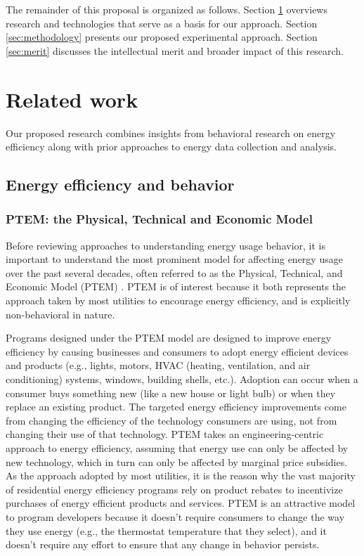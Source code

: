 The remainder of this proposal is organized as follows.  Section
\ref{sec:related-work} overviews research and technologies that serve as a
basis for our approach.  Section \ref{sec:methodology} presents our proposed
experimental approach.  Section \ref{sec:merit} discusses the intellectual
merit and broader impact of this research. 

\section{Related work}
\label{sec:related-work}

Our proposed research combines insights from behavioral research on energy
efficiency along with prior approaches to energy data collection and analysis.

\subsection{Energy efficiency and behavior}

\subsubsection{PTEM: the Physical, Technical and Economic Model}

Before reviewing approaches to understanding energy usage behavior, it is
important to understand the most prominent model for affecting energy usage over the
past several decades, often referred to as the Physical, Technical, and
Economic Model (PTEM) \cite{Lutzenhiser93}.  PTEM is of interest because it
both represents the approach taken by most utilities to encourage energy
efficiency, and is explicitly non-behavioral in nature.

Programs designed under the PTEM model are designed to improve energy
efficiency by causing businesses and consumers to adopt energy efficient
devices and products (e.g., lights, motors, HVAC (heating, ventilation, and
air conditioning) systems, windows, building shells, etc.).  Adoption can
occur when a consumer buys something new (like a new house or light bulb)
or when they replace an existing product.  The targeted energy efficiency
improvements come from changing the efficiency of the technology consumers
are using, not from changing their use of that technology.  PTEM takes an
engineering-centric approach to energy efficiency, assuming that energy use
can only be affected by new technology, which in turn can only be affected
by marginal price subsidies. As the approach adopted by most utilities, it
is the reason why the vast majority of residential energy efficiency
programs rely on product rebates to incentivize purchases of energy
efficient products and services. PTEM is an attractive model to program
developers because it doesn't require consumers to change the way they use
energy (e.g., the thermostat temperature that they select), and it doesn't
require any effort to ensure that any change in behavior persists.

